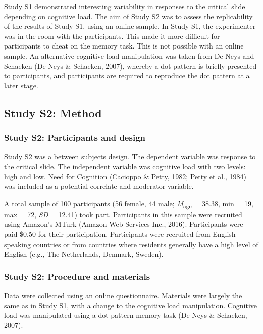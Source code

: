 \documentclass[
  american,
  man,floatsintext]{apa7}
\begin{document}
Study S1 demonstrated interesting variability in responses to the critical slide depending on cognitive load. The aim of Study S2 was to assess the replicability of the results of Study S1, using an online sample. In Study S1, the experimenter was in the room with the participants. This made it more difficult for participants to cheat on the memory task. This is not possible with an online sample. An alternative cognitive load manipulation was taken from De Neys and Schaeken (De Neys \& Schaeken, 2007), whereby a dot pattern is briefly presented to participants, and participants are required to reproduce the dot pattern at a later stage.

\hypertarget{study-s2-method}{%
\subsection{Study S2: Method}\label{study-s2-method}}

\hypertarget{study-s2-participants-and-design}{%
\subsubsection{Study S2: Participants and design}\label{study-s2-participants-and-design}}

Study S2 was a between subjects design. The dependent variable was response to the critical slide. The independent variable was cognitive load with two levels: high and low. Need for Cognition (Cacioppo \& Petty, 1982; Petty et al., 1984) was included as a potential correlate and moderator variable.

A total sample of 100 participants (56 female, 44 male; \emph{M}\textsubscript{age} = 38.38, min = 19, max = 72, \emph{SD} = 12.41) took part. Participants in this sample were recruited using Amazon's MTurk (Amazon Web Services Inc., 2016). Participants were paid \$0.50 for their participation. Participants were recruited from English speaking countries or from countries where residents generally have a high level of English (e.g., The Netherlands, Denmark, Sweden).

\hypertarget{study-s2-procedure-and-materials}{%
\subsubsection{Study S2: Procedure and materials}\label{study-s2-procedure-and-materials}}

Data were collected using an online questionnaire. Materials were largely the same as in Study S1, with a change to the cognitive load manipulation. Cognitive load was manipulated using a dot-pattern memory task (De Neys \& Schaeken, 2007).
\end{document}
